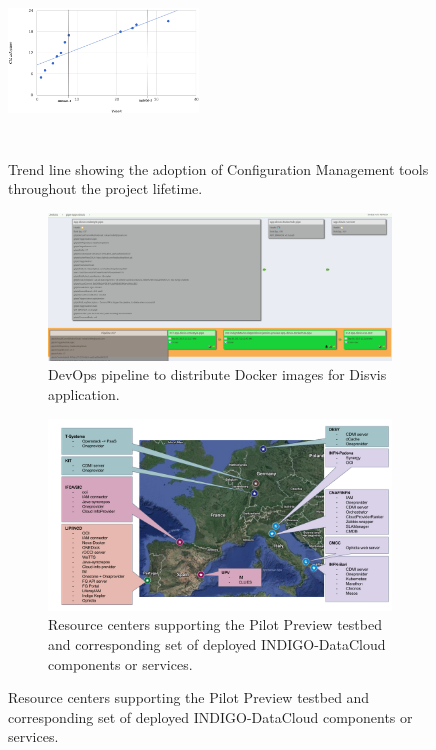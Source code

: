 \documentclass[journal]{IEEEtran}
\begin{document}
\begin{figure}[ht]
\centering
\includegraphics[width=0.45\textwidth, height=50mm]{images/confman.png}
\caption{Trend line showing the adoption of Configuration Management tools throughout the project lifetime.}
\label{fig:fig_confman}
\end{figure}

\begin{figure}	
	\centering
	\begin{subfigure}
		\centering
\includegraphics[width=\textwidth]{images/disvis.png}
\caption{DevOps pipeline to distribute Docker images for Disvis application.}
\label{fig:fig_disvis}		
	\end{subfigure}
	\quad
	\begin{subfigure}
		\centering
\includegraphics[width=\textwidth]{images/pilotpreview.png}
\caption{Resource centers supporting the Pilot Preview testbed and corresponding
set of deployed INDIGO-DataCloud components or services.}
\label{fig:fig_pilotpreview}
	\end{subfigure}
\end{figure}
\end{document}
